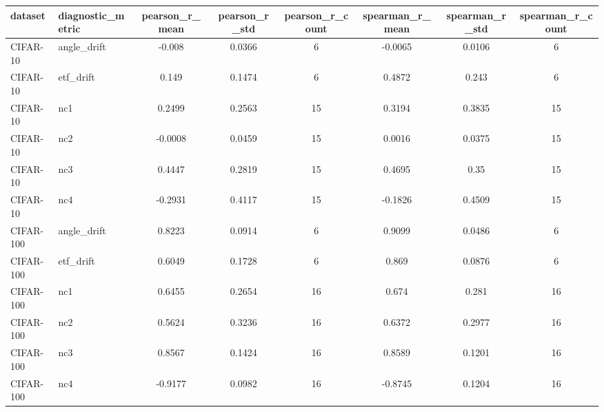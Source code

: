 \begin{tabular}{llcccccc}
\hline
dataset & diagnostic\_metric & pearson\_r\_mean & pearson\_r\_std & pearson\_r\_count & spearman\_r\_mean & spearman\_r\_std & spearman\_r\_count \\
\hline
CIFAR-10 & angle\_drift & -0.008 & 0.0366 & 6 & -0.0065 & 0.0106 & 6 \\
CIFAR-10 & etf\_drift & 0.149 & 0.1474 & 6 & 0.4872 & 0.243 & 6 \\
CIFAR-10 & nc1 & 0.2499 & 0.2563 & 15 & 0.3194 & 0.3835 & 15 \\
CIFAR-10 & nc2 & -0.0008 & 0.0459 & 15 & 0.0016 & 0.0375 & 15 \\
CIFAR-10 & nc3 & 0.4447 & 0.2819 & 15 & 0.4695 & 0.35 & 15 \\
CIFAR-10 & nc4 & -0.2931 & 0.4117 & 15 & -0.1826 & 0.4509 & 15 \\
CIFAR-100 & angle\_drift & 0.8223 & 0.0914 & 6 & 0.9099 & 0.0486 & 6 \\
CIFAR-100 & etf\_drift & 0.6049 & 0.1728 & 6 & 0.869 & 0.0876 & 6 \\
CIFAR-100 & nc1 & 0.6455 & 0.2654 & 16 & 0.674 & 0.281 & 16 \\
CIFAR-100 & nc2 & 0.5624 & 0.3236 & 16 & 0.6372 & 0.2977 & 16 \\
CIFAR-100 & nc3 & 0.8567 & 0.1424 & 16 & 0.8589 & 0.1201 & 16 \\
CIFAR-100 & nc4 & -0.9177 & 0.0982 & 16 & -0.8745 & 0.1204 & 16 \\
\hline
\end{tabular}

